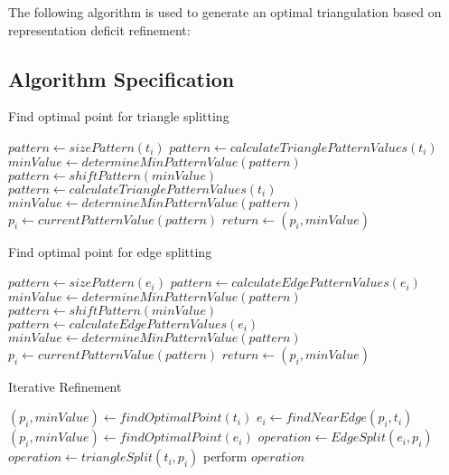 The following algorithm is used to generate an optimal triangulation
based on representation deficit refinement:

\subsection{Algorithm Specification}
\begin{algorithm}[H]
\begin{algorithmic}
\caption{Find optimal point for triangle splitting}
 
  \State $pattern \gets sizePattern\left( t_i \right)$
  \State $pattern \gets calculateTrianglePatternValues\left( t_i \right)$
  \State $minValue \gets determineMinPatternValue\left( pattern \right)$
    \State $pattern \gets shiftPattern\left( minValue \right)$
    \State $pattern \gets calculateTrianglePatternValues\left( t_i \right)$
    \State $minValue \gets determineMinPatternValue\left( pattern \right)$
  \EndWhile
  \State $p_i \gets currentPatternValue\left( pattern \right)$
  \State $return \gets \left( p_i, minValue \right)$
\EndProcedure
\end{algorithmic}
\end{algorithm}

\begin{algorithm}[H]
\begin{algorithmic}
\caption{Find optimal point for edge splitting}
 
  \State $pattern \gets sizePattern\left( e_i \right)$
  \State $pattern \gets calculateEdgePatternValues\left( e_i \right)$
  \State $minValue \gets determineMinPatternValue\left( pattern \right)$
    \State $pattern \gets shiftPattern\left( minValue \right)$
    \State $pattern \gets calculateEdgePatternValues\left( e_i \right)$
    \State $minValue \gets determineMinPatternValue\left( pattern \right)$
  \EndWhile
  \State $p_i \gets currentPatternValue\left( pattern \right)$
  \State $return \gets \left( p_i, minValue \right)$
\EndProcedure
\end{algorithmic}
\end{algorithm}

\begin{algorithm}[H]
\caption{Iterative Refinement}
\begin{algorithmic}
 
    \State $\left( p_i, minValue \right) \gets findOptimalPoint\left( t_i \right)$
      \State $e_i \gets findNearEdge\left( p_i, t_i \right)$
      \State $\left( p_i, minValue \right) \gets findOptimalPoint\left( e_i \right)$
      \State $operation \gets EdgeSplit\left( e_i, p_i \right)$
    \Else
      \State $operation \gets triangleSplit\left( t_i, p_i \right)$
    \EndIf
      \State perform $operation$
    \EndIf
  \EndFor
\EndProcedure
\end{algorithmic}
\end{algorithm}

